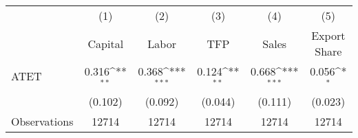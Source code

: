 {
\def\sym#1{\ifmmode^{#1}\else\(^{#1}\)\fi}
\begin{tabular}{l*{5}{c}}
\hline\hline
                    &\multicolumn{1}{c}{(1)}&\multicolumn{1}{c}{(2)}&\multicolumn{1}{c}{(3)}&\multicolumn{1}{c}{(4)}&\multicolumn{1}{c}{(5)}\\
                    &\multicolumn{1}{c}{Capital}&\multicolumn{1}{c}{Labor}&\multicolumn{1}{c}{TFP}&\multicolumn{1}{c}{Sales}&\multicolumn{1}{c}{Export Share}\\
\hline
ATET                &       0.316\sym{**} &       0.368\sym{***}&       0.124\sym{**} &       0.668\sym{***}&       0.056\sym{*}  \\
                    &     (0.102)         &     (0.092)         &     (0.044)         &     (0.111)         &     (0.023)         \\
\hline
Observations        &       12714         &       12714         &       12714         &       12714         &       12714         \\
\hline\hline
\end{tabular}
}
